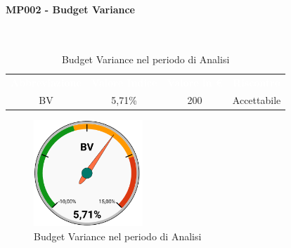 \paragraph{MP002 - Budget Variance}\mbox{}\\[0,3cm]
\begin{table}[H]
    \centering
    \begin{tabular}{cccc}
        \rowcolor{greySWEight}
        \textcolor{white}{\textbf{Abbreviazione}} &
        \textcolor{white}{\textbf{Valore Indice}}&
        \textcolor{white}{\textbf{Valore in €}}&
        \textcolor{white}{\textbf{Riscontro}}\\
        BV & 5,71\% & 200 & \textcolor{YellowOrange}{Accettabile}\\
    \end{tabular}
    \caption{Budget Variance nel periodo di Analisi}
\end{table}
\begin{figure}[H]
    \centering
	\includegraphics[height=4cm]{sez/App_Esito/Analisi/graph/AN_BV.pdf}
	\caption{Budget Variance nel periodo di Analisi}
\end{figure}